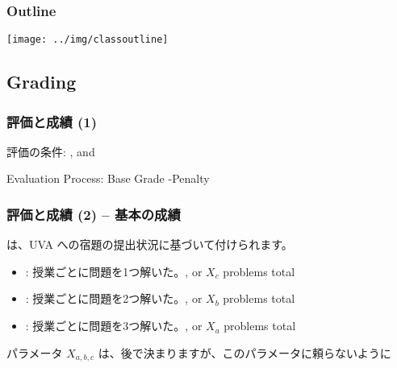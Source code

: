 \documentclass{beamer}
\begin{document}
\begin{frame}
  \frametitle{Outline}
  \begin{center}
    \texttt{[image: ../img/classoutline]}
  \end{center}
\end{frame}

\subsection{Grading}

\begin{frame}
  \frametitle{評価と成績 (1)}

  評価の条件: , 
  and 
  
  \bigskip

  Evaluation Process: Base Grade  \alert{-Penalty}
\end{frame}

\begin{frame}
  \frametitle{評価と成績 (2) -- 基本の成績}

  は、UVA への宿題の提出状況に基づいて付けられます。

  \bigskip
  
  \begin{itemize}
  \item {}: 授業ごとに問題を1つ解いた。, or $X_c$ problems total

    \medskip

  \item {}: 授業ごとに問題を2つ解いた。, or $X_b$ problems total

    \medskip

  \item {}: 授業ごとに問題を3つ解いた。, or $X_a$ problems total
  \end{itemize}

  \vfill

  {\small
    パラメータ $X_{a,b,c}$ は、後で決まりますが、\alert{このパラメータに頼らないように}}

\end{frame}
\end{document}
